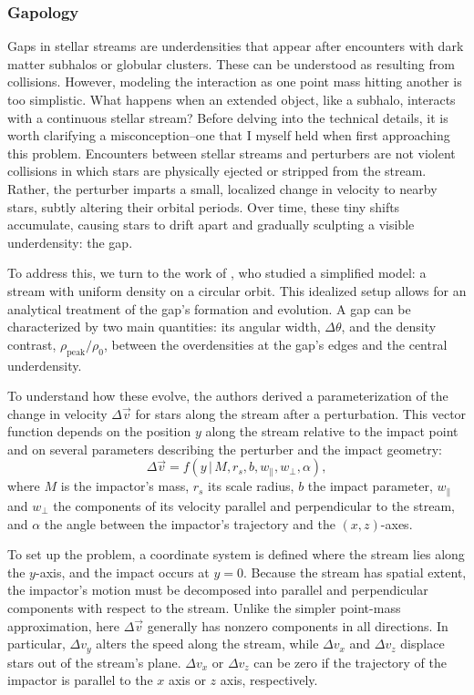         \subsubsection{Gapology}
            Gaps in stellar streams are underdensities that appear after encounters with dark matter subhalos or globular clusters. These can be understood as resulting from collisions. However, modeling the interaction as one point mass hitting another is too simplistic. What happens when an extended object, like a subhalo, interacts with a continuous stellar stream? Before delving into the technical details, it is worth clarifying a misconception--one that I myself held when first approaching this problem. Encounters between stellar streams and perturbers are not violent collisions in which stars are physically ejected or stripped from the stream. Rather, the perturber imparts a small, localized change in velocity to nearby stars, subtly altering their orbital periods. Over time, these tiny shifts accumulate, causing stars to drift apart and gradually sculpting a visible underdensity: the gap. 
            
            To address this, we turn to the work of \citet{2015MNRAS.450.1136E}, who studied a simplified model: a stream with uniform density on a circular orbit. This idealized setup allows for an analytical treatment of the gap's formation and evolution. A gap can be characterized by two main quantities: its angular width, $\Delta \theta$, and the density contrast, $\rho_{\mathrm{peak}}/\rho_0$, between the overdensities at the gap's edges and the central underdensity.


            To understand how these evolve, the authors derived a parameterization of the change in velocity $\Delta \vec{v}$ for stars along the stream after a perturbation. This vector function depends on the position $y$ along the stream relative to the impact point and on several parameters describing the perturber and the impact geometry:
            \[
            \Delta \vec{v} = f(y \,|\, M, r_s, b, w_\parallel, w_\perp, \alpha),
            \]
            where $M$ is the impactor's mass, $r_s$ its scale radius, $b$ the impact parameter, $w_\parallel$ and $w_\perp$ the components of its velocity parallel and perpendicular to the stream, and $\alpha$ the angle between the impactor's trajectory and the $(x,z)$-axes.

            To set up the problem, a coordinate system is defined where the stream lies along the $y$-axis, and the impact occurs at $y=0$. Because the stream has spatial extent, the impactor's motion must be decomposed into parallel and perpendicular components with respect to the stream. Unlike the simpler point-mass approximation, here $\Delta \vec{v}$ generally has nonzero components in all directions. In particular, $\Delta v_y$ alters the speed along the stream, while $\Delta v_x$ and $\Delta v_z$ displace stars out of the stream's plane. $\Delta v_x$ or $\Delta v_z$ can be zero if the trajectory of the impactor is parallel to the $x$ axis or $z$ axis, respectively. 


